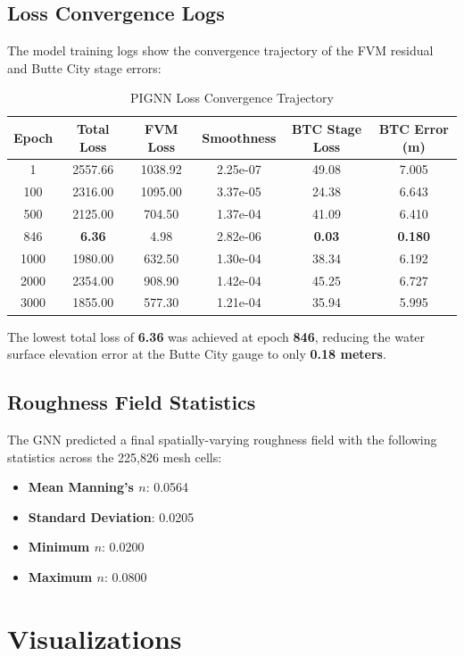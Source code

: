 \documentclass[11pt,a4paper]{article}
\begin{document}
\subsection{Loss Convergence Logs}
The model training logs show the convergence trajectory of the FVM residual and Butte City stage errors:
\begin{table}[H]
\centering
\caption{PIGNN Loss Convergence Trajectory}
\begin{tabular}{cccccc}
\toprule
\textbf{Epoch} & \textbf{Total Loss} & \textbf{FVM Loss} & \textbf{Smoothness} & \textbf{BTC Stage Loss} & \textbf{BTC Error (m)} \\
\midrule
1   & 2557.66 & 1038.92 & 2.25e-07 & 49.08 & 7.005 \\
100 & 2316.00 & 1095.00 & 3.37e-05 & 24.38 & 6.643 \\
500 & 2125.00 & 704.50  & 1.37e-04 & 41.09 & 6.410 \\
846 & \textbf{6.36} & 4.98 & 2.82e-06 & \textbf{0.03} & \textbf{0.180} \\
1000& 1980.00 & 632.50  & 1.30e-04 & 38.34 & 6.192 \\
2000& 2354.00 & 908.90  & 1.42e-04 & 45.25 & 6.727 \\
3000& 1855.00 & 577.30  & 1.21e-04 & 35.94 & 5.995 \\
\bottomrule
\end{tabular}
\label{tab:convergence}
\end{table}

The lowest total loss of \textbf{6.36} was achieved at epoch \textbf{846}, reducing the water surface elevation error at the Butte City gauge to only \textbf{0.18 meters}.

\subsection{Roughness Field Statistics}
The GNN predicted a final spatially-varying roughness field with the following statistics across the 225,826 mesh cells:
\begin{itemize}
    \item \textbf{Mean Manning's $n$}: 0.0564
    \item \textbf{Standard Deviation}: 0.0205
    \item \textbf{Minimum $n$}: 0.0200
    \item \textbf{Maximum $n$}: 0.0800
\end{itemize}

\section{Visualizations}
\end{document}
